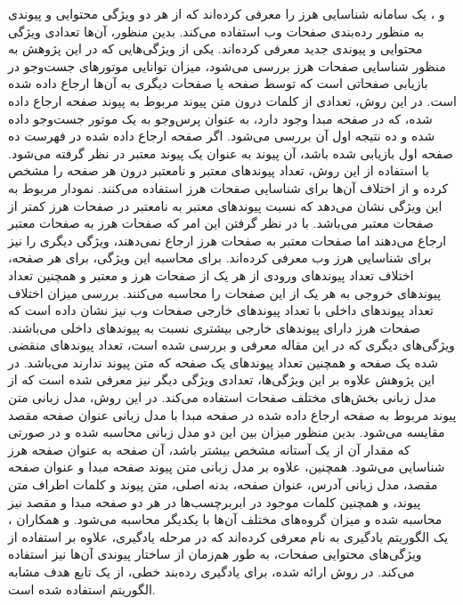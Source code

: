 \documentclass[twoside, a4paper,11pt]{book}
\numberwithin{equation}{chapter}
\numberwithin{table}{chapter}
\numberwithin{figure}{chapter}
\numberwithin{equation}{chapter}
\begin{document}
 و  \cite{araujo2010web}، یک سامانه شناسایی هرز را معرفی کرده‌اند که از هر دو ویژگی محتوایی و پیوندی به منظور رده‌بندی صفحات وب استفاده می‌کند. بدین منظور، آن‌ها تعدادی ویژگی محتوایی و پیوندی جدید معرفی کرده‌اند. یکی از ویژگی‌هایی که در این پژوهش به منظور شناسایی صفحات هرز بررسی می‌شود، میزان توانایی موتورهای جست‌و‌جو در بازیابی صفحاتی است که توسط صفحه یا صفحات دیگری به آن‌ها ارجاع داده شده است. در این روش، تعدادی از کلمات درون متن پیوند مربوط به پیوند صفحه‌ ارجاع داده شده، که در صفحه مبدا وجود دارد، به عنوان پرس‌وجو به یک موتور جست‌و‌جو داده شده و ده نتیجه اول آن بررسی می‌شود. اگر صفحه ارجاع داده شده در فهرست ده صفحه اول بازیابی شده باشد، آن پیوند به عنوان یک پیوند معتبر در نظر گرفته می‌شود. با استفاده از این روش، تعداد پیوندهای معتبر و نامعتبر درون هر صفحه را مشخص کرده و از اختلاف آن‌ها برای شناسایی صفحات هرز استفاده می‌کنند. نمودار مربوط به این ویژگی نشان می‌دهد که نسبت پیوندهای معتبر به نامعتبر در صفحات هرز کمتر از صفحات معتبر می‌باشد. با در نظر گرفتن این امر که صفحات هرز به صفحات معتبر ارجاع می‌دهند اما صفحات معتبر به صفحات هرز ارجاع نمی‌دهند، ویژگی دیگری را نیز برای شناسایی هرز وب معرفی کرده‌اند. برای محاسبه این ویژگی، برای هر صفحه، اختلاف تعداد پیوندهای ورودی از هر یک از صفحات هرز و معتبر و همچنین تعداد پیوندهای خروجی به هر یک از این صفحات را محاسبه می‌کنند. بررسی میزان اختلاف تعداد پیوندهای داخلی با تعداد پیوندهای خارجی صفحات وب نیز نشان داده است که صفحات هرز دارای پیوندهای خارجی بیشتری نسبت به پیوندهای داخلی می‌باشند. ویژگی‌های دیگری که در این مقاله معرفی و بررسی شده است، تعداد پیوندهای منقضی شده یک صفحه و همچنین تعداد پیوندهای یک صفحه که متن پیوند ندارند می‌باشد. در این پژوهش علاوه بر این ویژگی‌ها، تعدادی ویژگی دیگر نیز معرفی شده است که از مدل زبانی بخش‌های مختلف صفحات استفاده می‌کند. در این روش، مدل زبانی متن پیوند مربوط به صفحه ارجاع داده شده در صفحه مبدا با مدل زبانی عنوان صفحه مقصد مقایسه می‌شود. بدین منظور میزان  بین این دو مدل زبانی محاسبه شده و در صورتی که مقدار آن از یک آستانه مشخص بیشتر باشد، آن صفحه به عنوان صفحه هرز شناسایی می‌شود. همچنین، علاوه بر مدل زبانی متن پیوند صفحه مبدا و عنوان صفحه مقصد، مدل زبانی  آدرس، عنوان صفحه، بدنه اصلی، متن پیوند و کلمات اطراف متن پیوند، و همچنین کلمات موجود در ابربرچسب‌ها در هر دو صفحه مبدا و مقصد نیز محاسبه شده و میزان  گروه‌های مختلف آن‌ها با یکدیگر محاسبه می‌شود. 
 و همکاران \cite{abernethy2008web}، یک الگوریتم یادگیری به نام  معرفی کرده‌اند که در مرحله یادگیری، علاوه بر استفاده از ویژگی‌های محتوایی صفحات، به طور هم‌زمان از ساختار پیوندی آن‌ها نیز استفاده می‌کند. در روش ارائه شده، برای یادگیری رده‌بند خطی، از یک تابع هدف مشابه الگوریتم  استفاده شده است.  
\end{document}
